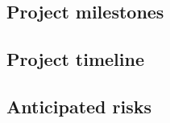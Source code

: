 \documentclass[../main.tex]{subfiles}
\begin{document}
\subsection{Project milestones}

\blindtext

\subsection{Project timeline}

\blindtext

\subsection{Anticipated risks}

\blindtext
\end{document}
